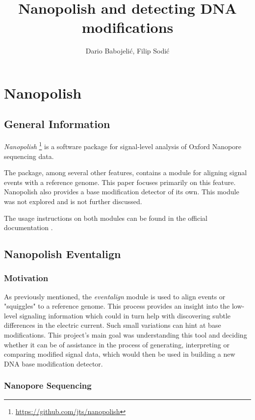 \documentclass[times, utf, seminar]{fer}
\title{Nanopolish and detecting DNA modifications}
\author{Dario Babojelić, Filip Sodić}
\begin{document}
\maketitle
\tableofcontents
\newpage

\chapter{Nanopolish}

\section{General Information}
\emph{Nanopolish}
\footnote{\url{https://github.com/jts/nanopolish}}
is a software package for signal-level analysis of Oxford Nanopore sequencing data.


The package, among several other features, contains a module for aligning signal events with a reference genome. This paper focuses primarily on this feature. Nanopolish also provides a base modification detector of its own. This module was not explored and is not further discussed.

The usage instructions on both modules can be found in the official documentation \citep{nanopolish}.

\section{Nanopolish Eventalign}

\subsection{Motivation}
As previously mentioned, the \emph{eventalign} module is used to align events or "squiggles" to a reference genome. This process provides an insight into the low-level signaling information which could in turn help with discovering subtle differences in
the electric current. Such small variations can hint at base modifications. This project's main goal was understanding this tool and deciding whether it can be of assistance in the process of generating, interpreting or comparing modified signal data, which would then be used in building a new DNA base modification detector.

\subsection{Nanopore Sequencing}\label{sequencing}
\end{document}
